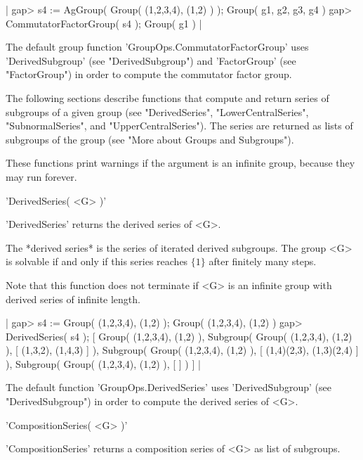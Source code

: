 |    gap> s4 := AgGroup( Group( (1,2,3,4), (1,2) ) );
    Group( g1, g2, g3, g4 )
    gap> CommutatorFactorGroup( s4 );
    Group( g1 ) |

The   default   group function   'GroupOps.CommutatorFactorGroup'    uses
'DerivedSubgroup'    (see   "DerivedSubgroup")   and  'FactorGroup'  (see
"FactorGroup") in order to compute the commutator factor group.



The following sections describe functions that compute and  return series
of subgroups of a given group (see "DerivedSeries", "LowerCentralSeries",
"SubnormalSeries", and "UpperCentralSeries").  The series are returned as
lists of subgroups of the group (see "More about Groups and Subgroups").

These  functions  print warnings  if the argument  is an infinite  group,
because they may run forever.


'DerivedSeries( <G> )'

'DerivedSeries' returns the derived series of <G>.

The *derived series*  is the series  of iterated derived  subgroups.  The
group <G> is solvable  if and only if this  series reaches  $\{1\}$ after
finitely many steps.

Note that this function does  not terminate  if <G>  is an infinite group
with derived  series of  infinite  length. 

|    gap> s4 := Group( (1,2,3,4), (1,2) );
    Group( (1,2,3,4), (1,2) )
    gap> DerivedSeries( s4 );
    [ Group( (1,2,3,4), (1,2) ), Subgroup( Group( (1,2,3,4), (1,2) ), 
        [ (1,3,2), (1,4,3) ] ), Subgroup( Group( (1,2,3,4), (1,2) ), 
        [ (1,4)(2,3), (1,3)(2,4) ] ), 
      Subgroup( Group( (1,2,3,4), (1,2) ), [  ] ) ] |

The default function 'GroupOps.DerivedSeries' uses 'DerivedSubgroup' (see
"DerivedSubgroup") in order to compute the derived series of <G>.


'CompositionSeries( <G> )'

'CompositionSeries'  returns  a composition  series  of <G>  as  list  of
subgroups.

